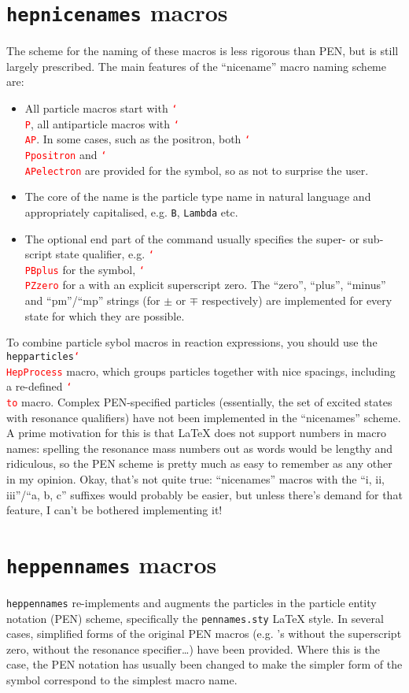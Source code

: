 \documentclass[12pt]{scrartcl}
\newcommand{\texcmd}[1]{\textcolor{red}{\texttt{\char`\\#1}}}
\newcommand{\texpkg}[1]{\texttt{#1}}
\DeclareRobustCommand{\hepparticles}{\texpkg{hepparticles}\xspace}
\DeclareRobustCommand{\heppennames}{\texpkg{heppennames}\xspace}
\DeclareRobustCommand{\hepnicenames}{\texpkg{hepnicenames}\xspace}
\begin{document}
\section{\hepnicenames macros}
The scheme for the naming of these macros is less rigorous than PEN, but is still
largely prescribed. The main features of the ``nicename'' macro naming scheme are:
%
\begin{itemize}
\item All particle macros start with \texcmd{P}, all antiparticle macros with
  \texcmd{AP}. In some cases, such as the positron, both \texcmd{Ppositron} and
  \texcmd{APelectron} are provided for the \Ppositron symbol, so as not to
  surprise the user.
\item The core of the name is the particle type name in natural language and
  appropriately capitalised, e.g. \texttt{B}, \texttt{Lambda} etc.
\item The optional end part of the command usually specifies the super- or
  sub-script state qualifier, e.g. \texcmd{PBplus} for the \PBplus symbol,
  \texcmd{PZzero} for a \PZ with an explicit superscript zero. The ``zero'',
  ``plus'', ``minus'' and ``pm''/``mp'' strings (for $\pm$ or $\mp$
  respectively) are implemented for every state for which they are possible.
\end{itemize}
%
To combine particle sybol macros in reaction expressions, you should use the
\hepparticles \texcmd{HepProcess} macro, which groups particles together with
nice spacings, including a re-defined \texcmd{to} macro.
%
Complex PEN-specified particles (essentially, the set of excited states with
resonance qualifiers) have not been implemented in the ``nicenames'' scheme.  A
prime motivation for this is that \LaTeX{} does not support numbers in macro
names: spelling the resonance mass numbers out as words would be lengthy and
ridiculous, so the PEN scheme is pretty much as easy to remember as any other in
my opinion. Okay, that's not quite true: ``nicenames'' macros with the ``i, ii,
iii''/``a, b, c'' suffixes would probably be easier, but unless there's demand
for that feature, I can't be bothered implementing it!



\clearpage

\section{\heppennames macros}
\heppennames re-implements and augments the particles in the particle entity
notation (PEN) scheme, specifically the \texttt{pennames.sty} \LaTeX{} style.
In several cases, simplified forms of the original PEN macros (e.g. \PZzero's
without the superscript zero, \PJgyi without the resonance specifier\dots) have
been provided. Where this is the case, the PEN notation has usually been changed
to make the simpler form of the symbol correspond to the simplest macro name.

\end{document}

